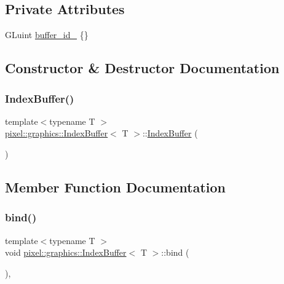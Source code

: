 \subsection*{Private Attributes}
\begin{DoxyCompactItemize}
\item 
G\+Luint \hyperlink{classpixel_1_1graphics_1_1_index_buffer_a85ecce71a34c017da3d2f45d89a07d11}{buffer\+\_\+id\+\_\+} \{\}
\end{DoxyCompactItemize}


\subsection{Constructor \& Destructor Documentation}
\mbox{\label{classpixel_1_1graphics_1_1_index_buffer_ac5e5c987e447ff151b794a9b61940a29}} 
\subsubsection{\texorpdfstring{Index\+Buffer()}{IndexBuffer()}}
{\footnotesize\ttfamily template$<$typename T $>$ \\
\hyperlink{classpixel_1_1graphics_1_1_index_buffer}{pixel\+::graphics\+::\+Index\+Buffer}$<$ T $>$\+::\hyperlink{classpixel_1_1graphics_1_1_index_buffer}{Index\+Buffer} (\begin{DoxyParamCaption}{ }\end{DoxyParamCaption})}



\subsection{Member Function Documentation}
\mbox{\label{classpixel_1_1graphics_1_1_index_buffer_a70b8fdbdd19c8800e005425712426bde}} 
\subsubsection{\texorpdfstring{bind()}{bind()}}
{\footnotesize\ttfamily template$<$typename T $>$ \\
void \hyperlink{classpixel_1_1graphics_1_1_index_buffer}{pixel\+::graphics\+::\+Index\+Buffer}$<$ T $>$\+::bind (\begin{DoxyParamCaption}{ }\end{DoxyParamCaption})\hspace{0.3cm}{\ttfamily [override]}, {\ttfamily [virtual]}}



